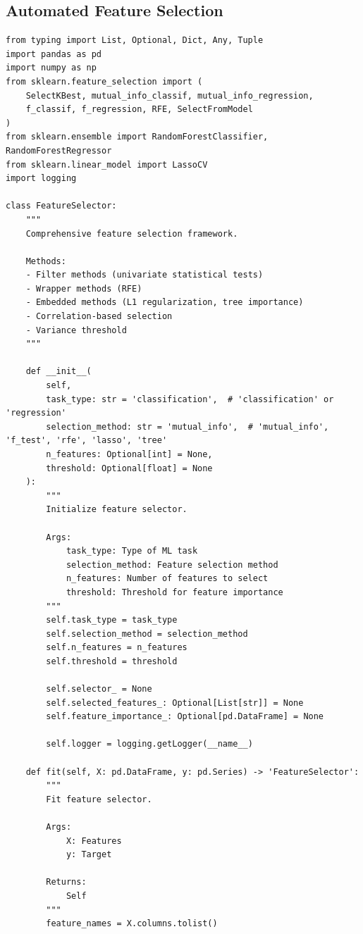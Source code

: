 \subsection{Automated Feature Selection}

\begin{lstlisting}[style=python, caption={Comprehensive Feature Selection Framework}]
from typing import List, Optional, Dict, Any, Tuple
import pandas as pd
import numpy as np
from sklearn.feature_selection import (
    SelectKBest, mutual_info_classif, mutual_info_regression,
    f_classif, f_regression, RFE, SelectFromModel
)
from sklearn.ensemble import RandomForestClassifier, RandomForestRegressor
from sklearn.linear_model import LassoCV
import logging

class FeatureSelector:
    """
    Comprehensive feature selection framework.

    Methods:
    - Filter methods (univariate statistical tests)
    - Wrapper methods (RFE)
    - Embedded methods (L1 regularization, tree importance)
    - Correlation-based selection
    - Variance threshold
    """

    def __init__(
        self,
        task_type: str = 'classification',  # 'classification' or 'regression'
        selection_method: str = 'mutual_info',  # 'mutual_info', 'f_test', 'rfe', 'lasso', 'tree'
        n_features: Optional[int] = None,
        threshold: Optional[float] = None
    ):
        """
        Initialize feature selector.

        Args:
            task_type: Type of ML task
            selection_method: Feature selection method
            n_features: Number of features to select
            threshold: Threshold for feature importance
        """
        self.task_type = task_type
        self.selection_method = selection_method
        self.n_features = n_features
        self.threshold = threshold

        self.selector_ = None
        self.selected_features_: Optional[List[str]] = None
        self.feature_importance_: Optional[pd.DataFrame] = None

        self.logger = logging.getLogger(__name__)

    def fit(self, X: pd.DataFrame, y: pd.Series) -> 'FeatureSelector':
        """
        Fit feature selector.

        Args:
            X: Features
            y: Target

        Returns:
            Self
        """
        feature_names = X.columns.tolist()


\end{lstlisting}
